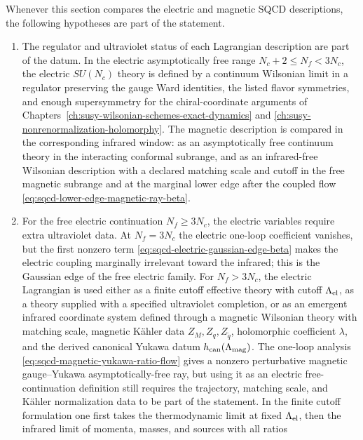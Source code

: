 \begin{hypothesis}
\label{hyp:sqcd-ir-comparison-hypotheses}
Whenever this section compares the electric and magnetic SQCD descriptions,
the following hypotheses are part of the statement.
\begin{enumerate}
\item The regulator and ultraviolet status of each Lagrangian description are
  part of the datum.  In the electric asymptotically free range
  \(N_c+2\le N_f<3N_c\), the electric \(SU(N_c)\) theory is defined by a
  continuum Wilsonian limit in a regulator preserving the gauge Ward
  identities, the listed flavor symmetries, and enough supersymmetry for the
  chiral-coordinate arguments of
  Chapters~\ref{ch:susy-wilsonian-schemes-exact-dynamics} and
  \ref{ch:susy-nonrenormalization-holomorphy}.  The magnetic description is
  compared in the corresponding infrared window: as an asymptotically free
  continuum theory in the interacting conformal subrange, and as an
  infrared-free Wilsonian description with a declared matching scale and
  cutoff in the free magnetic subrange and at the marginal lower edge after
  the coupled flow \eqref{eq:sqcd-lower-edge-magnetic-ray-beta}.
\item For the free electric continuation \(N_f\ge 3N_c\), the electric
  variables require extra ultraviolet data.  At \(N_f=3N_c\) the electric
  one-loop coefficient vanishes, but the first nonzero term
  \eqref{eq:sqcd-electric-gaussian-edge-beta} makes the electric coupling
  marginally irrelevant toward the infrared; this is the Gaussian edge of the
  free electric family.  For \(N_f>3N_c\), the electric
  Lagrangian is used either as a finite cutoff effective theory with cutoff
  \(\Lambda_{\rm el}\), as a theory supplied with a specified ultraviolet
  completion, or as an emergent infrared coordinate system defined through a
  magnetic Wilsonian theory with matching scale, magnetic Kähler data
  \(Z_M,Z_q,Z_{\widetilde q}\), holomorphic coefficient \(\lambda\), and the
  derived canonical Yukawa datum \(h_{\mathrm{can}}(\Lambda_{\rm mag})\).
  The one-loop analysis
  \eqref{eq:sqcd-magnetic-yukawa-ratio-flow} gives a nonzero perturbative
  magnetic gauge--Yukawa asymptotically-free ray, but using it as an electric
  free-continuation definition still requires the trajectory, matching scale,
  and Kähler normalization data to be part of the statement.  In the finite
  cutoff formulation one
  first takes the thermodynamic limit at fixed \(\Lambda_{\rm el}\), then the
  infrared limit of momenta, masses, and sources with all ratios

\end{enumerate}
\end{hypothesis}
